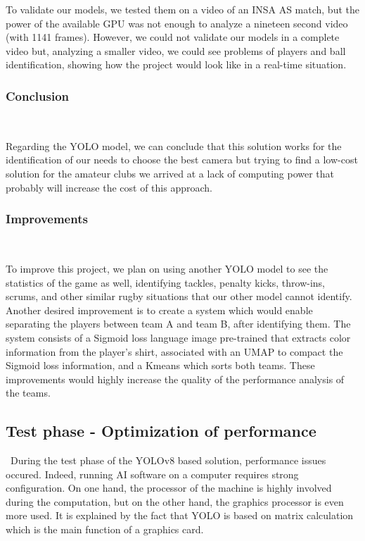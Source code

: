 \documentclass[conference]{IEEEtran}
\begin{document}
To validate our models, we tested them on a video of an INSA AS match, but the power of the available GPU was not enough to analyze a nineteen second video (with 1141 frames). However, we could not validate our models in a complete video but, analyzing a smaller video, we could see problems of players and ball identification, showing how the project would look like in a real-time situation.


\subsubsection{Conclusion}\

Regarding the YOLO model, we can conclude that this solution works for the identification of our needs to choose the best camera but trying to find a low-cost solution for the amateur clubs we arrived at a lack of computing power that probably will increase the cost of this approach.

\subsubsection{Improvements}\


To improve this project, we plan on using another YOLO model \cite{roboflow_tutorial_2024} to see the statistics of the game as well, identifying tackles, penalty kicks, throw-ins, scrums, and other similar rugby situations that our other model cannot identify. Another desired improvement is to create a system \cite{roboflow_tutorial_2024} which would enable separating the players between team A and team B, after identifying them. The system consists of a Sigmoid loss language image pre-trained\cite{roboflow_tutorial_2024} that extracts color information from the player’s shirt, associated with an UMAP\cite{roboflow_tutorial_2024} to compact the Sigmoid loss information, and a Kmeans \cite{roboflow_tutorial_2024} which sorts both teams. These improvements would highly increase the quality of the performance analysis of the teams.



\subsection{Test phase - Optimization of performance}\
During the test phase of the YOLOv8 based solution, performance issues occured. Indeed, running AI software on a computer requires strong configuration. On one hand, the processor of the machine is highly involved during the computation, but on the other hand, the graphics processor is even more used. It is explained by the fact that YOLO is based on matrix calculation \cite{xu_yolo-based_2025} which is the main function of a graphics card.
\end{document}
